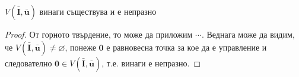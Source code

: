 
\begin{corollary}
  $V(\bar{\mathbf{I}}, \bar{\mathbf{u}})$ винаги съществува и е непразно
\end{corollary}

\begin{proof}
  От горното твърдение, то може да приложим $\cdots$.
  Веднага може да видим, че $V(\bar{\mathbf{I}}, \bar{\mathbf{u}}) \neq \varnothing$, понеже $\mathbf{0}$ е равновесна точка за кое да е управление и следователно $\mathbf{0} \in V(\bar{\mathbf{I}}, \bar{\mathbf{u}})$, т.е. винаги е непразно.
\end{proof}
